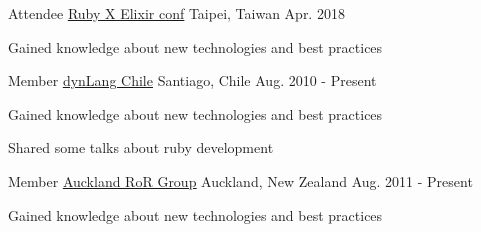 

\begin{cventries}

  \cventry
    {Attendee} %
    {\href{https://2018.rubyconf.tw/}{\underline{Ruby X Elixir conf}}} %
    {Taipei, Taiwan} %
    {Apr. 2018} %
    {
      \begin{cvitems} %
        \item {Gained knowledge about new technologies and best practices}
      \end{cvitems}
    }

  \cventry
    {Member} %
    {\href{http://www.meetup.com/dynlangchile/}{\underline{dynLang Chile}}} %
    {Santiago, Chile} %
    {Aug. 2010 - Present} %
    {
      \begin{cvitems} %
        \item {Gained knowledge about new technologies and best practices}
        \item {Shared some talks about ruby development}
      \end{cvitems}
    }

  \cventry
    {Member} %
    {\href{http://www.meetup.com/aucklandrails/}{\underline{Auckland RoR Group}}} %
    {Auckland, New Zealand} %
    {Aug. 2011 - Present} %
    {
      \begin{cvitems} %
        \item {Gained knowledge about new technologies and best practices}
      \end{cvitems}
    }

\end{cventries}
